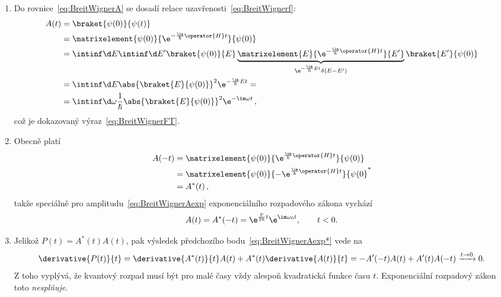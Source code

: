 \begin{solution}
	\begin{enumerate}
	\item
		Do rovnice~\eqref{eq:BreitWignerA} se dosadí relace uzavřenosti~\eqref{eq:BreitWignerf}:
		\begin{align}
			A(t)
				&=\braket{\psi(0)}{\psi(t)}\nonumber\\
				&=\matrixelement{\psi(0)}{\e^{-\frac{\im}{\hbar}\operator{H}t}}{\psi(0)}\nonumber\\
				&=\intinf\d E\intinf\d E'\braket{\psi(0)}{E}\underbrace{\matrixelement{E}{\e^{-\frac{\im}{\hbar}\operator{H}t}}{E'}}_{\e^{-\frac{\im}{\hbar}Et}\delta(E-E')}\braket{E'}{\psi(0)}\nonumber\\
				&=\intinf\d E\abs{\braket{E}{\psi(0)}}^{2}\e^{-\frac{\im}{\hbar}Et}=\nonumber\\
				&=\intinf\d\omega\frac{1}{\hbar}\abs{\braket{E}{\psi(0)}}^{2}\e^{-\im\omega t}\,,
		\end{align}
		což je dokazovaný výraz~\eqref{eq:BreitWignerFT}.
		
	\item
		Obecně platí
		\begin{align}
			A(-t)
				&=\matrixelement{\psi(0)}{\e^{\frac{\im}{\hbar}\operator{H}t}}{\psi(0)}\nonumber\\
				&=\matrixelement{\psi(0)}{-\e^{\frac{\im}{\hbar}\operator{H}t}}{\psi(0}^{*}\nonumber\\
				&=A^{*}(t)\,,
		\end{align}
		takže speciálně pro amplitudu~\eqref{eq:BreitWignerAexp} exponenciálního rozpadového zákona vychází
		\begin{equation}
			\label{eq:BreitWignerAexp*}
			A(t)=A^{*}(-t)=\e^{\frac{\Gamma}{2\hbar}t}\e^{\im\omega_{0}t},\qquad t<0.
		\end{equation}
	
	\item
		Jelikož $P(t)=A^{*}(t)A(t)$, pak výsledek předchozího bodu~\eqref{eq:BreitWignerAexp*} vede na
		\begin{equation}
			\derivative{P(t)}{t}=\derivative{A^{*}(t)}{t}A(t)+A^{*}(t)\derivative{A(t)}{t}=-A'(-t)A(t)+A'(t)A(-t)\xrightarrow{t\rightarrow0}0.
		\end{equation}
		Z toho vyplývá, že kvantový rozpad musí být pro malé časy vždy alespoň kvadratická funkce času $t$.
		Exponenciální rozpadový zákon toto \emph{nesplňuje}.
	

\end{enumerate}
\end{solution}
